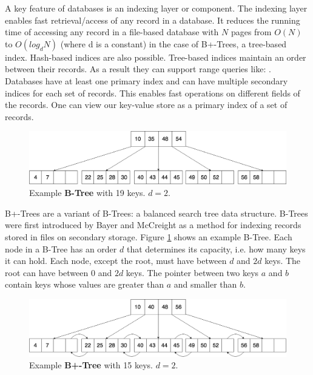 A key feature of databases is an indexing layer or component. The indexing layer enables fast retrieval/access of any record in a database. It reduces the running time of accessing any record in a file-based database with $N$ pages from $O(N)$ to $O(log _d N)$ (where d is a constant) in the case of B+-Trees, a tree-based index. Hash-based indices are also possible. Tree-based indices maintain an order between their records. As a result they can support range queries like: . Databases have at least one primary index and can have multiple secondary indices for each set of records. This enables fast operations on different fields of the records. One can view our key-value store as a primary index of a set of records.

\begin{figure}[hbtp]
    \centering
    \includegraphics[scale=0.3]{figures/ExampleBTree.png}
    \caption{Example \textbf{B-Tree} with 19 keys. $d = 2$.}
    \label{fig:exB-Tree}
\end{figure}

B+-Trees are a variant of B-Trees: a balanced search tree data structure. B-Trees were first introduced by Bayer and McCreight \cite{bayer1970organization} as a method for indexing records stored in files on secondary storage. Figure \ref{fig:exB-Tree} shows an example B-Tree. Each node in a B-Tree has an order $d$ that determines its capacity, i.e. how many keys it can hold. Each node, except the root, must have between $d$ and $2d$ keys. The root can have between $0$ and $2d$ keys. The pointer between two keys $a$ and $b$ contain keys whose values are greater than $a$ and smaller than $b$.

\begin{figure}[htbp]
    \centering
    \includegraphics[scale=0.3]{figures/ExampleBplusTree.png}
    \caption{Example \textbf{B+-Tree} with 15 keys. $d = 2$.}
    \label{fig:exB+-Tree}
\end{figure}

